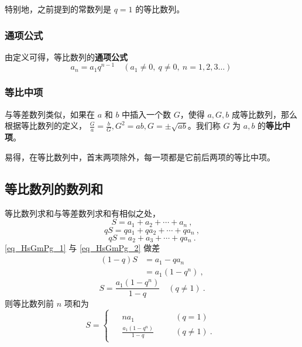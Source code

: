 特别地，之前提到的常数列是 $q = 1$ 的等比数列。

\subsubsection{通项公式}
由定义可得，等比数列的\textbf{通项公式}
\begin{equation}
a_n = a_1 q^{n-1} \quad (a_1 \ne 0,\ q\ne 0,\ n=1,2,3\dots)~
\end{equation}

\subsubsection{等比中项}
与等差数列类似，如果在 $a$ 和 $b$ 中插入一个数 $G$，使得 $a,G,b$ 成等比数列，那么根据等比数列的定义， $\frac{G}{a} = \frac{b}{G},G^2 = ab,G = \pm \sqrt{ab}$。我们称 $G$ 为 $a,b$ 的\textbf{等比中项}。

易得，在等比数列中，首末两项除外，每一项都是它前后两项的等比中项。

\subsection{等比数列的数列和}
等比数列求和与等差数列求和有相似之处，
\begin{equation}\label{eq_HsGmPg_1}
S = a_1 + a_2 + \cdots + a_n~,
\end{equation}
\begin{equation}
qS = qa_1 + qa_2 + \cdots + qa_n~,
\end{equation}
\begin{equation}\label{eq_HsGmPg_2}
qS= a_2 + a_3 + \cdots + qa_n~.
\end{equation}
\autoref{eq_HsGmPg_1} 与 \autoref{eq_HsGmPg_2} 做差
\begin{equation}
\begin{aligned}
(1 - q)S &= a_1 - qa_n\\
&= a_1(1 - q^n)~,
\end{aligned}
\end{equation}
\begin{equation}
S = \frac{a_1(1-q^n)}{1-q} \quad (q\neq 1)~.
\end{equation}
则等比数列前 $n$ 项和为
\begin{equation}
S = 
\begin{cases}
\begin{aligned}
&na_1 &\quad &(q = 1) \\
&\frac{a_1(1-q^n)}{1-q} &\quad &(q \neq 1)~.
\end{aligned}
\end{cases}
\end{equation}

